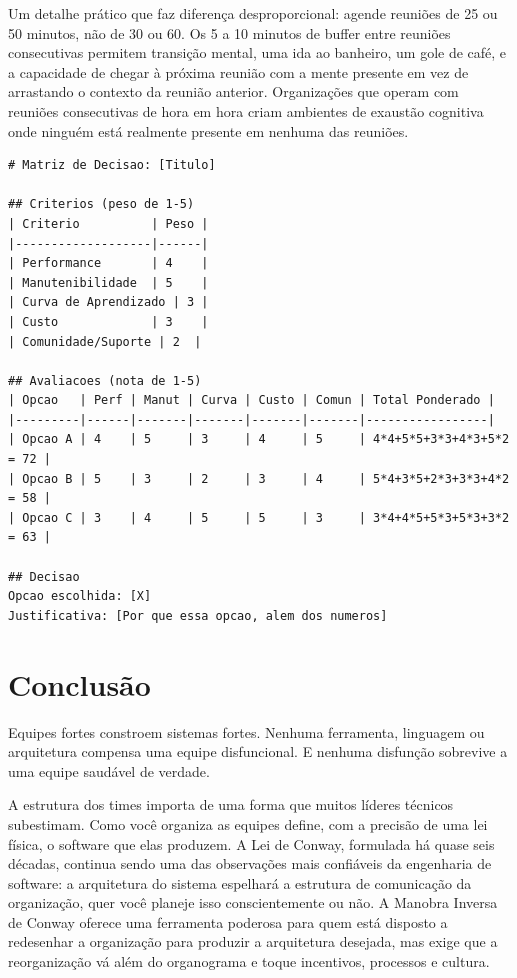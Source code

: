 Um detalhe prático que faz diferença desproporcional: agende reuniões de 25
ou 50 minutos, não de 30 ou 60. Os 5 a 10 minutos de buffer entre reuniões
consecutivas permitem transição mental, uma ida ao banheiro, um gole de
café, e a capacidade de chegar à próxima reunião com a mente presente em vez
de arrastando o contexto da reunião anterior. Organizações que operam com
reuniões consecutivas de hora em hora criam ambientes de exaustão cognitiva
onde ninguém está realmente presente em nenhuma das reuniões.

\begin{lstlisting}[language={}, caption={Matriz de Decisão Técnica}]
# Matriz de Decisao: [Titulo]

## Criterios (peso de 1-5)
| Criterio          | Peso |
|-------------------|------|
| Performance       | 4    |
| Manutenibilidade  | 5    |
| Curva de Aprendizado | 3 |
| Custo             | 3    |
| Comunidade/Suporte | 2  |

## Avaliacoes (nota de 1-5)
| Opcao   | Perf | Manut | Curva | Custo | Comun | Total Ponderado |
|---------|------|-------|-------|-------|-------|-----------------|
| Opcao A | 4    | 5     | 3     | 4     | 5     | 4*4+5*5+3*3+4*3+5*2 = 72 |
| Opcao B | 5    | 3     | 2     | 3     | 4     | 5*4+3*5+2*3+3*3+4*2 = 58 |
| Opcao C | 3    | 4     | 5     | 5     | 3     | 3*4+4*5+5*3+5*3+3*2 = 63 |

## Decisao
Opcao escolhida: [X]
Justificativa: [Por que essa opcao, alem dos numeros]
\end{lstlisting}

\section{Conclusão}

Equipes fortes constroem sistemas fortes. Nenhuma ferramenta, linguagem ou
arquitetura compensa uma equipe disfuncional. E nenhuma disfunção sobrevive
a uma equipe saudável de verdade.

A estrutura dos times importa de uma forma que muitos líderes técnicos
subestimam. Como você organiza as equipes define, com a precisão de uma
lei física, o software que elas produzem. A Lei de Conway, formulada há
quase seis décadas, continua sendo uma das observações mais confiáveis da
engenharia de software: a arquitetura do sistema espelhará a estrutura de
comunicação da organização, quer você planeje isso conscientemente ou não.
A Manobra Inversa de Conway oferece uma ferramenta poderosa para quem está
disposto a redesenhar a organização para produzir a arquitetura desejada,
mas exige que a reorganização vá além do organograma e toque incentivos,
processos e cultura.

